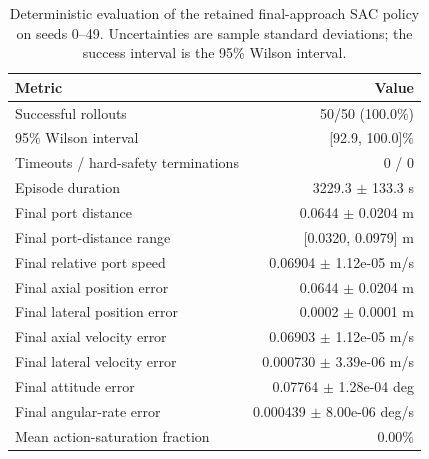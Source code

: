 \begin{table}[t]
\centering
\caption{Deterministic evaluation of the retained final-approach SAC policy on seeds 0--49. Uncertainties are sample standard deviations; the success interval is the 95\% Wilson interval.}
\label{tab:sac-final-lqr50}
\small
\begin{tabular}{lr}
\hline
Metric & Value \\
\hline
Successful rollouts & 50/50 (100.0\%) \\
95\% Wilson interval & [92.9, 100.0]\% \\
Timeouts / hard-safety terminations & 0 / 0 \\
Episode duration & 3229.3 $\pm$ 133.3 s \\
Final port distance & 0.0644 $\pm$ 0.0204 m \\
Final port-distance range & [0.0320, 0.0979] m \\
Final relative port speed & 0.06904 $\pm$ 1.12e-05 m/s \\
Final axial position error & 0.0644 $\pm$ 0.0204 m \\
Final lateral position error & 0.0002 $\pm$ 0.0001 m \\
Final axial velocity error & 0.06903 $\pm$ 1.12e-05 m/s \\
Final lateral velocity error & 0.000730 $\pm$ 3.39e-06 m/s \\
Final attitude error & 0.07764 $\pm$ 1.28e-04 deg \\
Final angular-rate error & 0.000439 $\pm$ 8.00e-06 deg/s \\
Mean action-saturation fraction & 0.00\% \\
\hline
\end{tabular}
\end{table}
